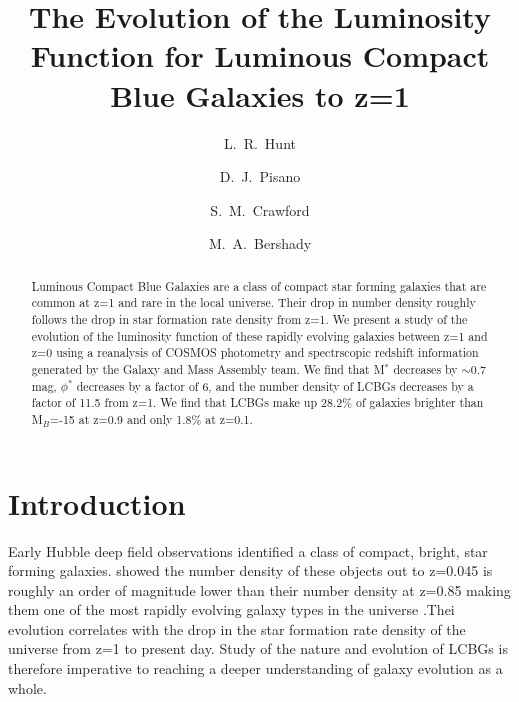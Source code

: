 \documentclass[manuscript]{aastex61}
\begin{document}
\title{The Evolution of the Luminosity Function for Luminous Compact Blue Galaxies to z=1}

\author{L.~R.~Hunt}
\author{D.~J.~Pisano}
\author{S.~M.~Crawford}
\author{M.~A.~Bershady}

\begin{abstract}
Luminous Compact Blue Galaxies are a class of compact star forming galaxies that are common at z=1 and rare in the local universe. Their drop in number density roughly follows the drop in star formation rate density from z=1. We present a study of the evolution of the luminosity function of these rapidly evolving galaxies between z=1 and z=0 using a reanalysis of COSMOS photometry and spectrscopic redshift information generated by the Galaxy and Mass Assembly team. We find that M$^{*}$ decreases by $\sim$0.7 mag, $\phi^{*}$ decreases by a factor of 6, and the number density of LCBGs decreases by a factor of 11.5 from z=1. We find that LCBGs make up 28.2\% of galaxies brighter than M$_{B}$=-15 at z=0.9 and only 1.8\% at z=0.1. 
\end{abstract}


\section{Introduction}

Early Hubble deep field observations identified a class of compact, bright, star forming galaxies. \citet{2004ApJ...617.1004W} showed the number density of these objects out to z=0.045 is roughly an order of magnitude lower than their number density at z=0.85 \citep{1997ApJ...489..543P} making them one of the most rapidly evolving galaxy types in the universe \citep{2007A&A...469..483R}.Thei evolution correlates with the drop in the star formation rate density of the universe from z=1 to present day. Study of the nature and evolution of LCBGs is therefore imperative to reaching a deeper understanding of galaxy evolution as a whole. 
\end{document}
